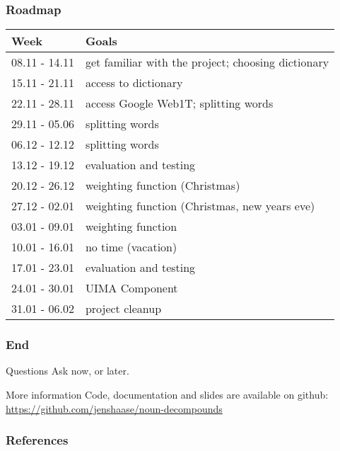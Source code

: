 \documentclass[accentcolor=tud9b, colorbacktitle, inverttitle]{tudbeamer}
\begin{document}
\begin{frame}
  \frametitle{Roadmap}

  \begin{tabular}{|l|l|}
  \hline
  \textbf{Week} & \textbf{Goals} \\ \hline
  08.11 - 14.11 & get familiar with the project; choosing dictionary \\ \hline
  15.11 - 21.11 & access to dictionary \\ \hline
  22.11 - 28.11 & access Google Web1T; splitting words \\ \hline
  29.11 - 05.06 & splitting words \\ \hline
  06.12 - 12.12 & splitting words \\ \hline
  13.12 - 19.12 & evaluation and testing \\ \hline
  20.12 - 26.12 & weighting function (Christmas) \\ \hline
  27.12 - 02.01 & weighting function (Christmas, new years eve) \\ \hline
  03.01 - 09.01 & weighting function \\ \hline
  10.01 - 16.01 & no time (vacation) \\ \hline
  17.01 - 23.01 & evaluation and testing \\ \hline
  24.01 - 30.01 & UIMA Component \\ \hline
  31.01 - 06.02 & project cleanup \\
  \hline
  \end{tabular}
\end{frame}

\begin{frame}
  \frametitle{End}
  
\begin{block}{Questions}
  Ask now, or later.
\end{block}

\begin{block}{More information}
  Code, documentation and slides are available on github: \url{https://github.com/jenshaase/noun-decompounds}
\end{block}
\end{frame}

\begin{frame}
  \frametitle{References}
  
  
  

\end{frame}
\end{document}
